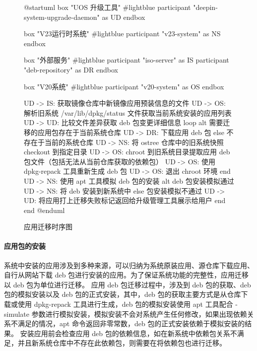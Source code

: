 \documentclass{utart}
\begin{document}
\begin{figure}[H]
    \centering
    \begin{plantuml}
        @startuml
        box "UOS 升级工具" #lightblue
        participant "deepin-system-upgrade-daemon" as UD                             
        endbox

        box "V23运行时系统" #lightblue
        participant "v23-system" as NS
        endbox
        
        box "外部服务" #lightblue
        participant "iso-server" as IS
        participant "deb-repository" as DR
        endbox

        box "V20系统" #lightblue
        participant "v20-system" as OS
        endbox

        UD -> IS: 获取镜像仓库中新镜像应用预装信息的文件
        UD -> OS: 解析旧系统 /var/lib/dpkg/status 文件获取当前系统安装的应用列表
        UD -> UD: 比较文件差异获取 deb 包变更详细信息
        loop
        alt 需要迁移的应用包存在于当前系统仓库
        UD -> DR: 下载应用 deb 包
        else 不存在于当前的系统仓库
        UD -> NS: 将 ostree 仓库中的旧系统快照 checkout 到指定目录
        UD -> OS: chroot 到旧系统目录提取应用 deb 包文件（包括无法从当前仓库获取的依赖包）
        UD -> OS: 使用 dpkg-repack 工具重新生成 deb 包
        UD -> OS: 退出 chroot 环境
        end
        UD -> NS: 使用 apt 工具模拟 deb 包的安装
        alt deb 包安装模拟通过 
        UD -> NS: 将 deb 安装到新系统中
        else 包安装模拟不通过
        UD -> UD: 将应用打上迁移失败标记返回给升级管理工具展示给用户
        end
        end
        @enduml
    \end{plantuml}
    \caption{应用迁移时序图}
    \label{fig:appmig}
\end{figure}

\paragraph{应用包的安装}
系统中安装的应用涉及到多种来源，可以归纳为系统原装应用、源仓库下载应用、自行从网站下载 deb 包进行安装的应用。为了保证系统功能的完整性，应用迁移以 deb 包为单位进行迁移。
应用 deb 包迁移过程中，涉及到 deb 包的获取、deb 包的模拟安装以及 deb 包的正式安装，其中，deb 包的获取主要方式是从仓库下载或使用 dpkg-repack 工具进行生成，deb 包的模拟安装使用 apt 工具配合 -simulate 参数进行模拟安装，模拟安装不会对系统产生任何修改，如果出现依赖关系不满足的情况，apt 命令返回非零常数，deb 包的正式安装依赖于模拟安装的结果。
安装应用前会检查应用 deb 包的依赖信息，如在新系统中依赖包关系不满足，并且新系统仓库中不存在此依赖包，则需要在将依赖包也进行迁移。
\end{document}
